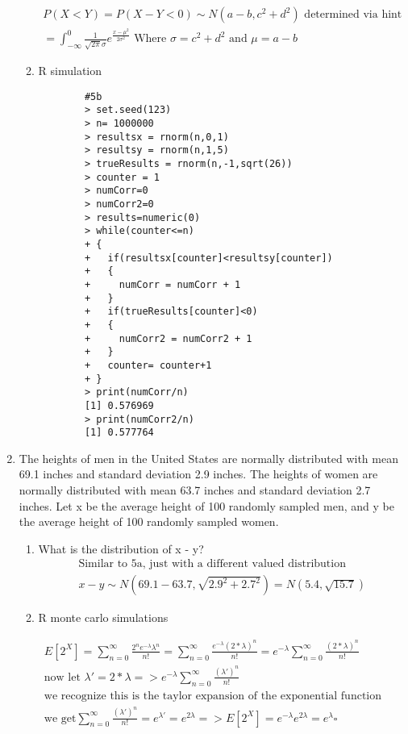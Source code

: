 \documentclass[11pt]{article}
\begin{document}
\begin{enumerate}
\begin{enumerate}
	\begin{gather}
		P(X<Y) = P(X-Y < 0) \sim N(a-b,c^2 + d^2) \text{ determined via hint}\\
		= \int_{-\infty}^{0} \frac{1}{\sqrt{2\pi} \sigma} e ^ {\frac{{x-\mu}^2}{2\sigma ^2}} \text{ Where } \sigma = c^2 + d^2 \text{ and } \mu = a-b
	\end{gather}
	\item R simulation
	\begin{verbatim}
		#5b
		> set.seed(123)
		> n= 1000000
		> resultsx = rnorm(n,0,1)
		> resultsy = rnorm(n,1,5)
		> trueResults = rnorm(n,-1,sqrt(26))
		> counter = 1
		> numCorr=0
		> numCorr2=0
		> results=numeric(0) 
		> while(counter<=n)
		+ {
		+   if(resultsx[counter]<resultsy[counter])
		+   {
		+     numCorr = numCorr + 1
		+   }
		+   if(trueResults[counter]<0)
		+   {
		+     numCorr2 = numCorr2 + 1
		+   }
		+   counter= counter+1
		+ }
		> print(numCorr/n)
		[1] 0.576969
		> print(numCorr2/n)
		[1] 0.577764
	\end{verbatim}
\end{enumerate}
\item The heights of men in the United States are normally distributed with mean 69.1 inches and standard deviation
2.9 inches. The heights of women are normally distributed with mean 63.7 inches and standard deviation 2.7 inches. Let x be the average height of 100 randomly sampled men, and y be the average height
of 100 randomly sampled women.
\begin{enumerate}
	\item What is the distribution of x - y?
	\begin{gather}
		\text{Similar to 5a, just with a different valued distribution}\\
		x-y \sim N(69.1-63.7,\sqrt{2.9^2+2.7^2}) = N(5.4,\sqrt{15.7})
	\end{gather}
	\item R monte carlo simulations 
\end{enumerate}
\begin{gather} 
	E[2^X] =\sum_{n=0}^{\infty} \frac{2^n e^{-\lambda} \lambda ^n}{n!} = \sum_{n=0}^{\infty} \frac{e^{-\lambda} (2*\lambda) ^n}{n!} = e^{-\lambda}  \sum_{n=0}^{\infty} \frac{(2*\lambda) ^n}{n!}\\
	\text{now let } \lambda' = 2*\lambda => e^{-\lambda}  \sum_{n=0}^{\infty} \frac{(\lambda') ^n}{n!}\\
	\text{we recognize this is the taylor expansion of the exponential function}\\
	\text{we get} \sum_{n=0}^{\infty} \frac{(\lambda') ^n}{n!} = e^{\lambda'} = e^{2\lambda}  => E[2^X] = e^{-\lambda} e^{2\lambda}  = e^{\lambda} \square

\end{gather}
\end{enumerate}
\end{document}
